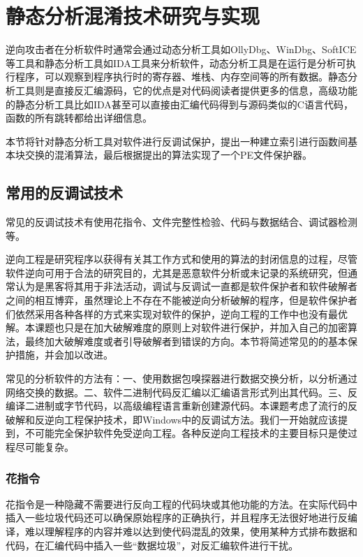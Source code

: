 \chapter{静态分析混淆技术研究与实现}
逆向攻击者在分析软件时通常会通过动态分析工具如OllyDbg、WinDbg、SoftICE等工具和静态分析工具如IDA工具来分析软件，动态分析工具是在运行是分析可执行程序，可以观察到程序执行时的寄存器、堆栈、内存空间等的所有数据。静态分析工具则是直接反汇编源码，它的优点是对代码阅读者提供更多的信息，高级功能的静态分析工具比如IDA甚至可以直接由汇编代码得到与源码类似的C语言代码，函数的所有跳转都给出详细信息。

本节将针对静态分析工具对软件进行反调试保护，提出一种建立索引进行函数间基本块交换的混淆算法，最后根据提出的算法实现了一个PE文件保护器。
\section{常用的反调试技术}
\label{cha2:sec:techarch}

常见的反调试技术有使用花指令、文件完整性检验、代码与数据结合、调试器检测等。

逆向工程是研究程序以获得有关其工作方式和使用的算法的封闭信息的过程，尽管软件逆向可用于合法的研究目的，尤其是恶意软件分析或未记录的系统研究，但通常认为是黑客将其用于非法活动，调试与反调试一直都是软件保护者和软件破解者之间的相互博弈，虽然理论上不存在不能被逆向分析破解的程序，但是软件保护者们依然采用各种各样的方式来实现对软件的保护，逆向工程的工作中也没有最优解。本课题也只是在加大破解难度的原则上对软件进行保护，并加入自己的加密算法，最终加大破解难度或者引导破解者到错误的方向。本节将简述常见的的基本保护措施，并会加以改进。

常见的分析软件的方法有：一、使用数据包嗅探器进行数据交换分析，以分析通过网络交换的数据。二、软件二进制代码反汇编以汇编语言形式列出其代码。三、反编译二进制或字节代码，以高级编程语言重新创建源代码。本课题考虑了流行的反破解和反逆向工程保护技术，即Windows中的反调试方法。我们一开始就应该提到，不可能完全保护软件免受逆向工程。各种反逆向工程技术的主要目标只是使过程尽可能复杂。

\subsection{花指令}

花指令是一种隐藏不需要进行反向工程的代码块或其他功能的方法。在实际代码中插入一些垃圾代码还可以确保原始程序的正确执行，并且程序无法很好地进行反编译，难以理解程序的内容并难以达到使代码混乱的效果，使用某种方式排布数据和代码，在汇编代码中插入一些“数据垃圾”，对反汇编软件进行干扰。

